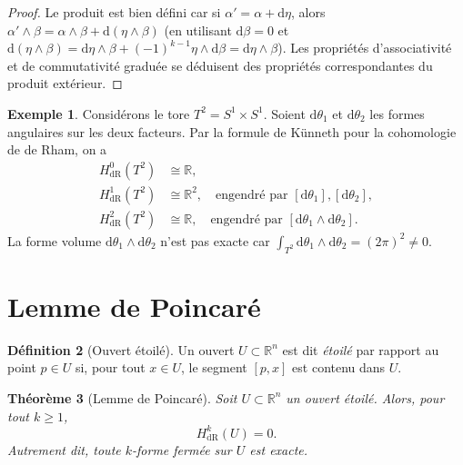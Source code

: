 \documentclass[12pt,a4paper,openany]{book}
\theoremstyle{definition}
\newtheorem{definition}{Définition}[chapter]
\newtheorem{exemple}[definition]{Exemple}
\theoremstyle{plain}
\newtheorem{theoreme}[definition]{Théorème}
\theoremstyle{remark}
\newcommand{\R}{\mathbb{R}}
\newcommand{\dd}{\mathrm{d}}
\begin{document}
\begin{proof}
Le produit est bien défini car si $\alpha' = \alpha + \dd\eta$, alors
$\alpha' \wedge \beta = \alpha \wedge \beta + \dd(\eta \wedge \beta)$
(en utilisant $\dd\beta = 0$ et $\dd(\eta \wedge \beta)
= \dd\eta \wedge \beta + (-1)^{k-1}\eta \wedge \dd\beta
= \dd\eta \wedge \beta$). Les propriétés d'associativité et de commutativité
graduée se déduisent des propriétés correspondantes du produit extérieur.
\end{proof}

\begin{exemple}\label{ex:cohomologie-tore}
Considérons le tore $T^2 = S^1 \times S^1$. Soient $\dd\theta_1$ et
$\dd\theta_2$ les formes angulaires sur les deux facteurs. Par la formule de
Künneth pour la cohomologie de de Rham, on a
\begin{align*}
  H^0_{\mathrm{dR}}(T^2) &\cong \R, \\
  H^1_{\mathrm{dR}}(T^2) &\cong \R^2,
    \quad \text{engendré par } [\dd\theta_1], [\dd\theta_2], \\
  H^2_{\mathrm{dR}}(T^2) &\cong \R,
    \quad \text{engendré par } [\dd\theta_1 \wedge \dd\theta_2].
\end{align*}
La forme volume $\dd\theta_1 \wedge \dd\theta_2$ n'est pas exacte car
$\int_{T^2} \dd\theta_1 \wedge \dd\theta_2 = (2\pi)^2 \neq 0$.
\end{exemple}

\section{Lemme de Poincaré}\label{sec:poincare}

\begin{definition}[Ouvert étoilé]\label{def:etoile}
Un ouvert $U \subset \R^n$ est dit \emph{étoilé} par rapport au point
$p \in U$ si, pour tout $x \in U$, le segment $[p,x]$ est contenu dans $U$.
\end{definition}

\begin{theoreme}[Lemme de Poincaré]\label{thm:poincare}
Soit $U \subset \R^n$ un ouvert étoilé. Alors, pour tout $k \geq 1$,
\[
  H^k_{\mathrm{dR}}(U) = 0.
\]
Autrement dit, toute $k$-forme fermée sur $U$ est exacte.
\end{theoreme}
\end{document}
